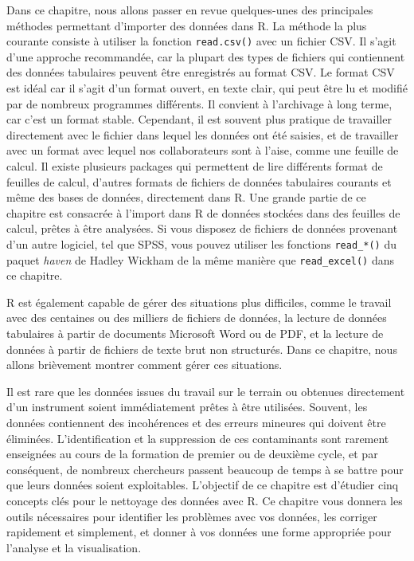 \documentclass[
  french,
]{scrbook}
\begin{document}
Dans ce chapitre, nous allons passer en revue quelques-unes des principales méthodes permettant d'importer des données dans R. La méthode la plus courante consiste à utiliser la fonction \texttt{read.csv()} avec un fichier CSV. Il s'agit d'une approche recommandée, car la plupart des types de fichiers qui contiennent des données tabulaires peuvent être enregistrés au format CSV. Le format CSV est idéal car il s'agit d'un format ouvert, en texte clair, qui peut être lu et modifié par de nombreux programmes différents. Il convient à l'archivage à long terme, car c'est un format stable. Cependant, il est souvent plus pratique de travailler directement avec le fichier dans lequel les données ont été saisies, et de travailler avec un format avec lequel nos collaborateurs sont à l'aise, comme une feuille de calcul. Il existe plusieurs packages qui permettent de lire différents format de feuilles de calcul, d'autres formats de fichiers de données tabulaires courants et même des bases de données, directement dans R. Une grande partie de ce chapitre est consacrée à l'import dans R de données stockées dans des feuilles de calcul, prêtes à être analysées. Si vous disposez de fichiers de données provenant d'un autre logiciel, tel que SPSS, vous pouvez utiliser les fonctions \texttt{read\_*()} du paquet \emph{haven} de Hadley Wickham de la même manière que \texttt{read\_excel()} dans ce chapitre.

R est également capable de gérer des situations plus difficiles, comme le travail avec des centaines ou des milliers de fichiers de données, la lecture de données tabulaires à partir de documents Microsoft Word ou de PDF, et la lecture de données à partir de fichiers de texte brut non structurés. Dans ce chapitre, nous allons brièvement montrer comment gérer ces situations.

Il est rare que les données issues du travail sur le terrain ou obtenues directement d'un instrument soient immédiatement prêtes à être utilisées. Souvent, les données contiennent des incohérences et des erreurs mineures qui doivent être éliminées. L'identification et la suppression de ces contaminants sont rarement enseignées au cours de la formation de premier ou de deuxième cycle, et par conséquent, de nombreux chercheurs passent beaucoup de temps à se battre pour que leurs données soient exploitables. L'objectif de ce chapitre est d'étudier cinq concepts clés pour le nettoyage des données avec R. Ce chapitre vous donnera les outils nécessaires pour identifier les problèmes avec vos données, les corriger rapidement et simplement, et donner à vos données une forme appropriée pour l'analyse et la visualisation.
\end{document}
